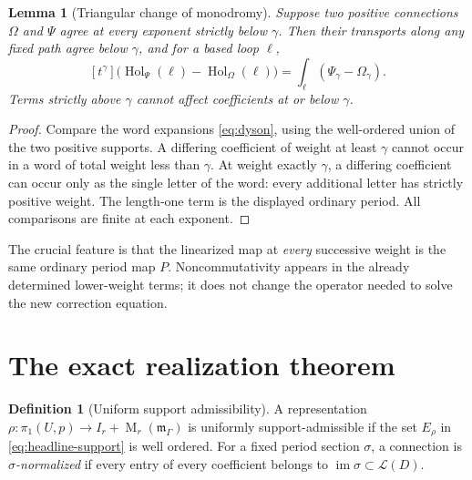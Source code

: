 \documentclass[11pt,letterpaper]{article}
\numberwithin{equation}{section}
\newtheorem{lemma}[theorem]{Lemma}
\theoremstyle{definition}
\newtheorem{definition}[theorem]{Definition}
\theoremstyle{remark}
\newcommand{\LL}{\mathcal L}
\newcommand{\mm}{\mathfrak m}
\newcommand{\Hol}{\operatorname{Hol}}
\newcommand{\Mat}{\operatorname{M}}
\newcommand{\im}{\operatorname{im}}
\newcommand{\coeff}[1]{[t^{#1}]}
\begin{document}
\begin{lemma}[Triangular change of monodromy]\label{lem:triangular}
Suppose two positive connections $\Omega$ and $\Psi$ agree at every exponent
strictly below $\gamma$. Then their transports along any fixed path agree
below $\gamma$, and for a based loop $\ell$,
\begin{equation}\label{eq:triangular}
 \coeff{\gamma}\bigl(\Hol_\Psi(\ell)-\Hol_\Omega(\ell)\bigr)
       =\int_\ell(\Psi_\gamma-\Omega_\gamma).
\end{equation}
Terms strictly above $\gamma$ cannot affect coefficients at or below
$\gamma$.
\end{lemma}
\begin{proof}
Compare the word expansions \eqref{eq:dyson}, using the well-ordered union of
the two positive supports. A differing coefficient of weight at least
$\gamma$ cannot occur in a word of total weight less than $\gamma$. At
weight exactly $\gamma$, a differing coefficient can occur only as the
single letter of the word: every additional letter has strictly positive
weight. The length-one term is the displayed ordinary period. All
comparisons are finite at each exponent.
\end{proof}

The crucial feature is that the linearized map at \emph{every} successive
weight is the same ordinary period map $P$. Noncommutativity appears in the
already determined lower-weight terms; it does not change the operator
needed to solve the new correction equation.

\section{The exact realization theorem}\label{sec:main}

\begin{definition}[Uniform support admissibility]
A representation
$\rho:\pi_1(U,p)\to I_r+\Mat_r(\mm_\Gamma)$ is uniformly support-admissible
if the set $E_\rho$ in \eqref{eq:headline-support} is well ordered.
For a fixed period section $\sigma$, a connection is
\emph{$\sigma$-normalized} if every entry of every coefficient belongs to
$\im\sigma\subset\LL(D)$.
\end{definition}
\end{document}
